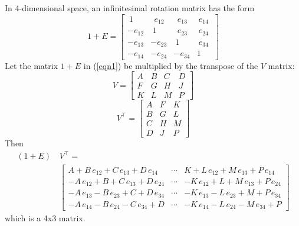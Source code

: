 In 4-dimensional space, an infinitesimal rotation matrix has the form
\begin{equation}
\label{eqn1}
1 + E =
\begin{bmatrix}
~1~     & ~~e_{12} & ~~e_{13} & ~e_{14}~ \\
-e_{12} &  ~1~     & ~~e_{23} & ~e_{24}~ \\
-e_{13} &  -e_{23} &  ~1~     & ~e_{34}~ \\
-e_{14} &  -e_{24} &  -e_{34} &  1~~
\end{bmatrix}
\end{equation}
Let the matrix $1 + E$ in (\ref{eqn1}) be multiplied by the transpose of the $V$
matrix:
\begin{equation*}
V =
\begin{bmatrix}
A & B & C & D \\
F & G & H & J \\
K & L & M & P
\end{bmatrix}
\end{equation*}
\begin{equation*}
V^\top =
\begin{bmatrix}
A & F & K \\
B & G & L \\
C & H & M \\
D & J & P
\end{bmatrix}
\end{equation*}
Then
\begin{align*}
(1 + E) \, & V^\top = \\
& \left[
\begin{array}{rrr}
 A + B \, e_{12} + C \, e_{13} + D \, e_{14} &
\cdots                                       &
 K + L \, e_{12} + M \, e_{13} + P \, e_{14} \\
-A \, e_{12} + B + C \, e_{13} + D \, e_{24} &
\cdots                                       &
-K \, e_{12} + L + M \, e_{13} + P \, e_{24} \\
-A \, e_{13} - B \, e_{23} + C + D \, e_{34} &
\cdots                                       &
-K \, e_{13} - L \, e_{23} + M + P \, e_{34} \\
-A \, e_{14} - B \, e_{24} - C \, e_{34} + D &
\cdots                                       &
-K \, e_{14} - L \, e_{24} - M \, e_{34} + P
\end{array}
\right]
\end{align*}
which is a 4x3 matrix.

